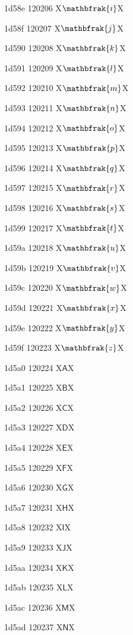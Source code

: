 \documentclass[11pt]{article}
\begin{document}
1d58e 120206 X{\ensuremath{\mathbfrak{i}}}X

1d58f 120207 X{\ensuremath{\mathbfrak{j}}}X

1d590 120208 X{\ensuremath{\mathbfrak{k}}}X

1d591 120209 X{\ensuremath{\mathbfrak{l}}}X

1d592 120210 X{\ensuremath{\mathbfrak{m}}}X

1d593 120211 X{\ensuremath{\mathbfrak{n}}}X

1d594 120212 X{\ensuremath{\mathbfrak{o}}}X

1d595 120213 X{\ensuremath{\mathbfrak{p}}}X

1d596 120214 X{\ensuremath{\mathbfrak{q}}}X

1d597 120215 X{\ensuremath{\mathbfrak{r}}}X

1d598 120216 X{\ensuremath{\mathbfrak{s}}}X

1d599 120217 X{\ensuremath{\mathbfrak{t}}}X

1d59a 120218 X{\ensuremath{\mathbfrak{u}}}X

1d59b 120219 X{\ensuremath{\mathbfrak{v}}}X

1d59c 120220 X{\ensuremath{\mathbfrak{w}}}X

1d59d 120221 X{\ensuremath{\mathbfrak{x}}}X

1d59e 120222 X{\ensuremath{\mathbfrak{y}}}X

1d59f 120223 X{\ensuremath{\mathbfrak{z}}}X

1d5a0 120224 X{\ensuremath{\mathsf{A}}}X

1d5a1 120225 X{\ensuremath{\mathsf{B}}}X

1d5a2 120226 X{\ensuremath{\mathsf{C}}}X

1d5a3 120227 X{\ensuremath{\mathsf{D}}}X

1d5a4 120228 X{\ensuremath{\mathsf{E}}}X

1d5a5 120229 X{\ensuremath{\mathsf{F}}}X

1d5a6 120230 X{\ensuremath{\mathsf{G}}}X

1d5a7 120231 X{\ensuremath{\mathsf{H}}}X

1d5a8 120232 X{\ensuremath{\mathsf{I}}}X

1d5a9 120233 X{\ensuremath{\mathsf{J}}}X

1d5aa 120234 X{\ensuremath{\mathsf{K}}}X

1d5ab 120235 X{\ensuremath{\mathsf{L}}}X

1d5ac 120236 X{\ensuremath{\mathsf{M}}}X

1d5ad 120237 X{\ensuremath{\mathsf{N}}}X
\end{document}
